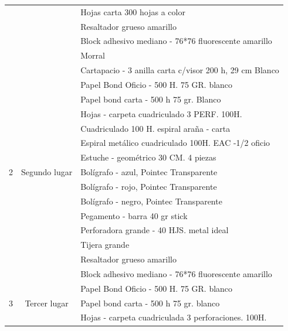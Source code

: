 \documentclass{article}
\begin{document}
\begin{table}[htbp]
{\begin{tabular}{|c|c|l|}
\cmidrule{3-3}          &       & Hojas carta 300 hojas a color \\
\cmidrule{3-3}          &       & Resaltador grueso amarillo \\
\cmidrule{3-3}          &       & Block adhesivo mediano - 76*76 fluorescente amarillo \\
\cmidrule{3-3}          &       & Morral  \\
    \midrule
    \multirow{15}[30]{*}{2} & \multirow{15}[30]{*}{Segundo lugar} & Cartapacio - 3 anilla carta c/visor 200 h, 29 cm Blanco \\
\cmidrule{3-3}          &       & Papel Bond Oficio - 500 H. 75 GR. blanco \\
\cmidrule{3-3}          &       & Papel bond carta - 500 h 75 gr. Blanco \\
\cmidrule{3-3}          &       & Hojas - carpeta cuadriculado 3 PERF. 100H. \\
\cmidrule{3-3}          &       & Cuadriculado 100 H. espiral araña - carta \\
\cmidrule{3-3}          &       & Espiral metálico cuadriculado 100H. EAC -1/2 oficio \\
\cmidrule{3-3}          &       & Estuche - geométrico 30 CM. 4 piezas \\
\cmidrule{3-3}          &       & Bolígrafo - azul, Pointec Transparente \\
\cmidrule{3-3}          &       & Bolígrafo - rojo, Pointec Transparente \\
\cmidrule{3-3}          &       & Bolígrafo - negro, Pointec Transparente \\
\cmidrule{3-3}          &       & Pegamento - barra 40 gr stick \\
\cmidrule{3-3}          &       & Perforadora grande - 40 HJS. metal ideal \\
\cmidrule{3-3}          &       & Tijera grande \\
\cmidrule{3-3}          &       & Resaltador grueso amarillo \\
\cmidrule{3-3}          &       & Block adhesivo mediano - 76*76 fluorescente amarillo \\
    \midrule
    \multirow{10}[20]{*}{3} & \multirow{10}[20]{*}{Tercer lugar} & Papel Bond Oficio - 500 H. 75 GR. blanco \\
\cmidrule{3-3}          &       & Papel bond carta - 500 h 75 gr. blanco \\
\cmidrule{3-3}          &       & Hojas - carpeta cuadriculada 3 perforaciones. 100H. \\

\end{tabular}}
\end{table}
\end{document}
